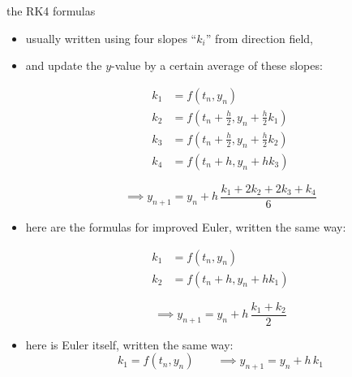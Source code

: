\documentclass[urlcolor=blue,dvipsnames]{beamer}
\begin{document}
\begin{frame}{the RK4 formulas}

\small
\begin{itemize}
\item usually written using four slopes ``$k_i$'' from direction field,
\item and update the $y$-value by a certain average of these slopes:

\vspace{-6mm}
\begin{minipage}[t]{0.4\textwidth}
\begin{align*}
k_1 &= f(t_n,y_n) \\
k_2 &= f(t_n+\frac{h}{2},y_n+\frac{h}{2} k_1) \\
k_3 &= f(t_n+\frac{h}{2},y_n+\frac{h}{2} k_2) \\
k_4 &= f(t_n+h,y_n+h k_3)
\end{align*}
\end{minipage}\begin{minipage}[t]{0.45\textwidth}
\vspace{10mm}

$$\implies y_{n+1} = y_n + h\, \frac{k_1 + 2 k_2 + 2 k_3 + k_4}{6}$$
\end{minipage}
\item here are the formulas for improved Euler, written the same way:

\vspace{-6mm}
\begin{minipage}[t]{0.4\textwidth}
\begin{align*}
k_1 &= f(t_n,y_n) \\
k_2 &= f(t_n+h,y_n+h k_1)
\end{align*}
\end{minipage}
\begin{minipage}[t]{0.4\textwidth}
\vspace{2mm}

$$\implies y_{n+1} = y_n + h\, \frac{k_1 + k_2}{2}$$
\end{minipage}
\item here is Euler itself, written the same way:
$$k_1 = f(t_n,y_n) \qquad \implies y_{n+1} = y_n + h\, k_1$$
\end{itemize}
\end{frame}
\end{document}
